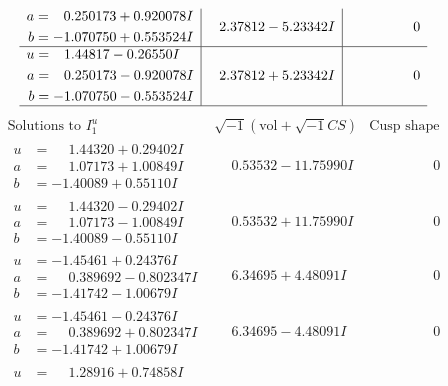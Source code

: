 \documentclass[1p]{elsarticle_modified}
\theoremstyle{definition}
\newcommand{\I}{\sqrt{-1}}
\begin{document}
$$\begin{array}{c|c|c}
\begin{aligned}
a &= \phantom{-}0.250173 + 0.920078 I \\
b &= -1.070750 + 0.553524 I\end{aligned}
 & \phantom{-}2.37812 - 5.23342 I & \phantom{-0.000000 } 0 \\ \hline\begin{aligned}
u &= \phantom{-}1.44817 - 0.26550 I \\
a &= \phantom{-}0.250173 - 0.920078 I \\
b &= -1.070750 - 0.553524 I\end{aligned}
 & \phantom{-}2.37812 + 5.23342 I & \phantom{-0.000000 } 0\\
 \hline 
 \end{array}$$\newpage$$\begin{array}{c|c|c}  
\text{Solutions to }I^u_{1}& \I (\text{vol} + \sqrt{-1}CS) & \text{Cusp shape}\\
 \hline 
\begin{aligned}
u &= \phantom{-}1.44320 + 0.29402 I \\
a &= \phantom{-}1.07173 + 1.00849 I \\
b &= -1.40089 + 0.55110 I\end{aligned}
 & \phantom{-}0.53532 - 11.75990 I & \phantom{-0.000000 } 0 \\ \hline\begin{aligned}
u &= \phantom{-}1.44320 - 0.29402 I \\
a &= \phantom{-}1.07173 - 1.00849 I \\
b &= -1.40089 - 0.55110 I\end{aligned}
 & \phantom{-}0.53532 + 11.75990 I & \phantom{-0.000000 } 0 \\ \hline\begin{aligned}
u &= -1.45461 + 0.24376 I \\
a &= \phantom{-}0.389692 - 0.802347 I \\
b &= -1.41742 - 1.00679 I\end{aligned}
 & \phantom{-}6.34695 + 4.48091 I & \phantom{-0.000000 } 0 \\ \hline\begin{aligned}
u &= -1.45461 - 0.24376 I \\
a &= \phantom{-}0.389692 + 0.802347 I \\
b &= -1.41742 + 1.00679 I\end{aligned}
 & \phantom{-}6.34695 - 4.48091 I & \phantom{-0.000000 } 0 \\ \hline\begin{aligned}
u &= \phantom{-}1.28916 + 0.74858 I \\

\end{aligned}
\end{array}$$
\end{document}
